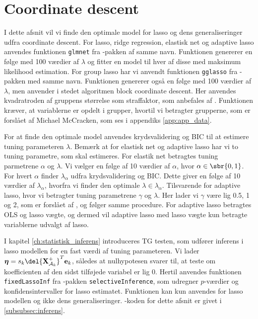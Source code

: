 \section{Coordinate descent}
I dette afsnit vil vi finde den optimale model for lasso og dens generaliseringer udfra coordinate descent.
For lasso, ridge regression, elastisk net og adaptive lasso anvendes funktionen \texttt{glmnet} fra \Rlang-pakken af samme navn.
Funktionen genererer en følge med 100 værdier af $\lambda$ og fitter en model til hver af disse med maksimum likelihood estimation.
For group lasso har vi anvendt funktionen \texttt{gglasso} fra \Rlang-pakken med samme navn. 
Funktionen genererer også en følge med 100 værdier af $\lambda$, men anvender i stedet algoritmen block coordinate descent. 
Her anvendes kvadratroden af gruppens størrelse som straffaktor, som anbefales af \citep{group_lasso}.
Funktionen kræver, at variablerne er opdelt i grupper, hvortil vi betragter grupperne, som er forslået af Michael McCracken, som ses i appendiks \ref{app:app_data}. 

For at finde den optimale model anvendes krydsvalidering og BIC til at estimere tuning parameteren $\lambda$.
Bemærk at for elastisk net og adaptive lasso har vi to tuning parametre, som skal estimeres. 
For elastik net betragtes tuning parmetrene $\alpha$ og $\lambda$.
Vi vælger en følge af 10 værdier af \(\alpha\), hvor $\alpha \in \sbr{0,1}$.
For hvert \(\alpha\) finder \(\lambda_\alpha\) udfra krydsvalidering og BIC.
Dette giver en følge af 10 værdier af \(\lambda_\alpha\), hvorfra vi finder den optimale \(\lambda \in \lambda_\alpha\).
Tilsvarende for adaptive lasso, hvor vi betragter tuning parametrene $\gamma$ og $\lambda$.
Her lader vi $\gamma$ være lig 0.5, 1 og 2, som er forslået af \citep{adaptive_lasso}, og følger samme procedure.
For adaptive lasso betragtes OLS og lasso vægte, og dermed vil adaptive lasso med lasso vægte kun betragte variablerne udvalgt af lasso.

I kapitel \ref{ch:statistisk_inferens} introduceres TG testen, som udfører inferens i lasso modellen for en fast værdi af tuning parameteren.
Vi lader $\boldsymbol{\eta} = s_k \del{\textbf{X}^+_{\mathcal{A}_k}}^T \mathbf{e}_k$, således at nulhypotesen svarer til, at teste om koefficienten af den sidst tilføjede variabel er lig 0.
Hertil anvendes funktionen \texttt{fixedLassoInf} fra \Rlang-pakken \texttt{selectiveInference}, som udregner \(p\)-værdier og konfidensintervaller for lasso estimatet.
Funktionen kan kun anvendes for lasso modellen og ikke dens generaliseringer. 
\Rlang-koden for dette afsnit er givet i \ref{subsubsec:inferens}.





